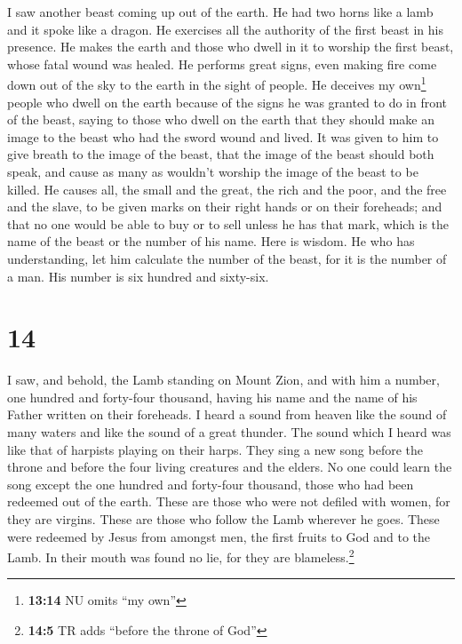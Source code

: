  I saw another beast coming up out of the earth. He had
two horns like a lamb and it spoke like a dragon.  He
exercises all the authority of the first beast in his presence. He makes
the earth and those who dwell in it to worship the first beast, whose
fatal wound was healed.  He performs great signs, even
making fire come down out of the sky to the earth in the sight of
people.  He deceives my own\footnote{\textbf{13:14} NU
  omits ``my own''} people who dwell on the earth because of the signs
he was granted to do in front of the beast, saying to those who dwell on
the earth that they should make an image to the beast who had the sword
wound and lived.  It was given to him to give breath to
the image of the beast, that the image of the beast should both speak,
and cause as many as wouldn't worship the image of the beast to be
killed.  He causes all, the small and the great, the rich
and the poor, and the free and the slave, to be given marks on their
right hands or on their foreheads;  and that no one would
be able to buy or to sell unless he has that mark, which is the name of
the beast or the number of his name.  Here is wisdom. He
who has understanding, let him calculate the number of the beast, for it
is the number of a man. His number is six hundred and sixty-six.

\hypertarget{section-13}{%
\section{14}\label{section-13}}

 I saw, and behold, the Lamb standing on Mount Zion, and
with him a number, one hundred and forty-four thousand, having his name
and the name of his Father written on their foreheads.  I
heard a sound from heaven like the sound of many waters and like the
sound of a great thunder. The sound which I heard was like that of
harpists playing on their harps.  They sing a new song
before the throne and before the four living creatures and the elders.
No one could learn the song except the one hundred and forty-four
thousand, those who had been redeemed out of the earth. 
These are those who were not defiled with women, for they are virgins.
These are those who follow the Lamb wherever he goes. These were
redeemed by Jesus from amongst men, the first fruits to God and to the
Lamb.  In their mouth was found no lie, for they are
blameless.\footnote{\textbf{14:5} TR adds ``before the throne of God''}

